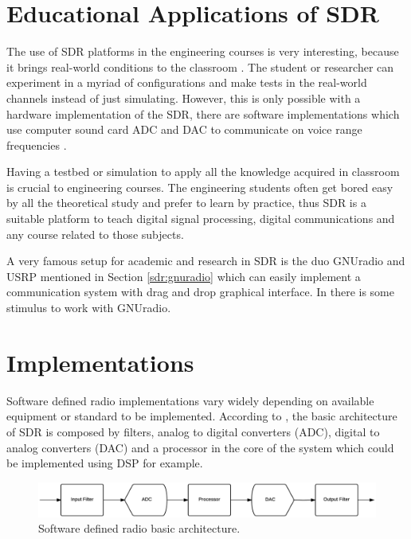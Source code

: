 \section{Educational Applications of SDR}

The use of SDR platforms in the engineering courses is very interesting, because
it brings real-world conditions to the classroom \cite{ladimer2009}. The student
or researcher can experiment in a myriad of configurations and make tests in the
real-world channels instead of just simulating. However, this is only possible
with a hardware implementation of the SDR, there are software implementations
which use computer sound card ADC and DAC to communicate on voice range
frequencies \cite{ladimer2009}.

Having a testbed or simulation to apply all the knowledge acquired in classroom
is crucial to engineering courses. The engineering students often get bored easy
by all the theoretical study and prefer to learn by practice, thus SDR is a
suitable platform to teach digital signal processing, digital communications and
any course related to those subjects.

A very famous setup for academic and research in SDR is the duo GNUradio
\cite{web:gnuradio} and USRP \cite{web:usrp} mentioned in Section
\ref{sdr:gnuradio} which can easily implement a communication system with drag
and drop graphical interface. In \cite{akbook} there is some stimulus to work
with GNUradio.


\section{Implementations}
\label{sdr:implement}

Software defined radio implementations vary widely depending on available
equipment or standard to be implemented. According to \cite{ladimer2009}, the basic
architecture of SDR is composed by filters, analog to digital converters (ADC),
digital to analog converters (DAC) and a processor in the core of the system
which could be implemented using DSP for example.

\begin{figure}[htbp]
    \centering
    \includegraphics[width=1\textwidth]{./figures/sdr_basic_arch}
    \caption{ Software defined radio basic architecture.
    \label{fig:sdr_basic}}
\end{figure}


